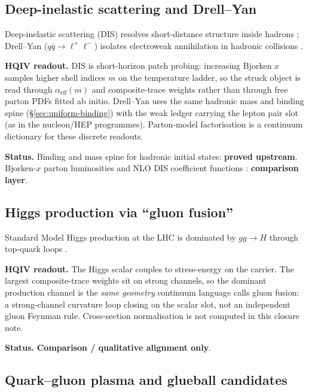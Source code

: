 \documentclass[11pt]{amsart}
\begin{document}
\subsection{Deep-inelastic scattering and Drell--Yan}
\label{subsec:dis-dy}

Deep-inelastic scattering (DIS) resolves short-distance structure inside hadrons
\cite{bloom1969,friedman1972,bjorken1969,peskin1995,pdg2024};
Drell--Yan ($q\bar q\to \ell^+\ell^-$) isolates electroweak annihilation in hadronic
collisions \cite{drell1970,peskin1995,pdg2024}.

\textbf{HQIV readout.} DIS is short-horizon patch probing: increasing Bjorken $x$
\cite{bjorken1969,peskin1995} samples higher shell indices $m$ on the temperature
ladder, so the struck object is
read through $\alpha_{\mathrm{eff}}(m)$ and composite-trace weights rather than through
free parton PDFs fitted ab initio. Drell--Yan uses the same hadronic mass and binding
spine (\S\ref{sec:uniform-binding}) with the weak ledger carrying the lepton pair slot
(as in the nucleon/HEP programmes). Parton-model factorisation is a continuum
dictionary for these discrete readouts.

\textbf{Status.} Binding and mass spine for hadronic initial states: \textbf{proved
upstream}. Bjorken-$x$ parton luminosities and NLO DIS coefficient functions
\cite{bjorken1969,drell1970,peskin1995,pdg2024}:
\textbf{comparison layer}.

\subsection{Higgs production via ``gluon fusion''}
\label{subsec:ggH}

Standard Model Higgs production at the LHC is dominated by $gg\to H$ through top-quark
loops \cite{pdg2024,peskin1995}.

\textbf{HQIV readout.} The Higgs scalar couples to stress-energy on the carrier. The
largest composite-trace weights sit on strong channels, so the dominant production
channel is the \emph{same geometry} continuum language calls gluon fusion: a
strong-channel curvature loop closing on the scalar slot, not an independent gluon
Feynman rule. Cross-section normalisation is not computed in this closure note.

\textbf{Status.} \textbf{Comparison / qualitative alignment only}.

\subsection{Quark--gluon plasma and glueball candidates}
\label{subsec:qgp-glueball}
\end{document}
